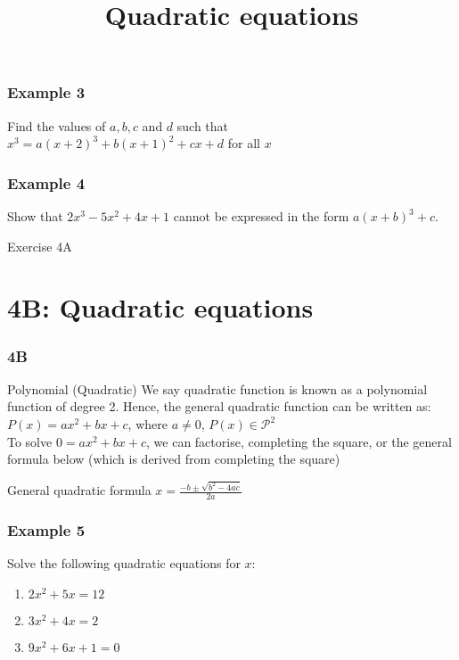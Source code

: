 \documentclass{beamer}
\begin{document}
\begin{frame}[t]
    \frametitle{Example 3}
    Find the values of $a,b,c$ and $d$ such that\\
    $x^3 = a(x+2)^3 + b(x+1)^2 + cx + d$ for all $x$
\end{frame}
\begin{frame}
\end{frame}

\begin{frame}[t]
    \frametitle{Example 4}
    Show that $2x^3 - 5x^2 + 4x + 1$ cannot be expressed in the form $a(x+b)^3 + c$.
\end{frame}
\begin{frame}
\end{frame}

\begin{frame}{Exercise 4A}
\end{frame}
\section{4B: Quadratic equations}
\begin{frame} 
    \frametitle{4B}
    \begin{center}
        \title{Quadratic equations}
        \maketitle
    \end{center}
\end{frame}

\begin{frame}{Polynomial (Quadratic)}
    We say quadratic function is known as a polynomial function of degree 2. Hence, the general quadratic function can be written as:\\
    $P(x) = ax^2 + bx + c$, where $a \neq 0$, $P(x)\in \mathcal{P}^2$\\
    \bigskip
    To solve $0 = ax^2 + bx + c$, we can factorise, completing the square, or the general formula below (which is derived from completing the square)\\
    \begin{block}{General quadratic formula}
        $x = \frac{-b \pm \sqrt{b^2 - 4ac}}{2a}$
    \end{block}
\end{frame}

\begin{frame}[t]
    \frametitle{Example 5}
    Solve the following quadratic equations for $x$:
    \begin{enumerate}
        \item $2x^2 + 5x = 12$
        \item $3x^2 + 4x = 2$
        \item $9x^2 + 6x + 1 = 0$
    \end{enumerate}    
\end{frame}
\begin{frame}
\end{frame}
\end{document}

